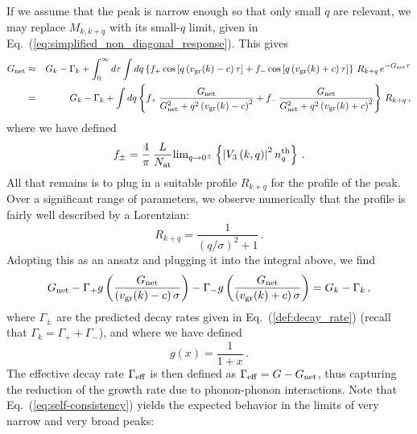 \documentclass[aps,prd,notitlepage,amsfonts,amssymb,amsmath,nofootinbib,superscriptaddress,longbibliography]{revtex4-2}
\begin{document}
\begin{appendices}
If we assume that the peak is narrow enough so that only small $q$ are relevant, we may replace $M_{k,k+q}$ with its small-$q$ limit, given in Eq.~(\ref{eq:simplified_non_diagonal_response}).  This gives
\begin{eqnarray}
    G_{\rm net} &\approx& G_{k}-\Gamma_{k} + \int_{0}^{\infty} d \tau \int dq \left\{ f_{+} \, {\rm cos}\left[q \left(v_{\rm gr}(k)-c\right) \tau \right] + f_{-} \, {\rm cos}\left[q \left(v_{\rm gr}(k)+c\right) \tau \right] \right\} \, R_{k+q} \, e^{-G_{\rm net} \tau} \nonumber \\
    &=& G_{k}-\Gamma_{k} + \int dq \left\{ f_{+} \, \frac{G_{\rm net}}{G_{\rm net}^{2} + q^{2}\left(v_{\rm gr}(k)-c\right)^{2}} + f_{-} \, \frac{G_{\rm net}}{G_{\rm net}^{2} + q^{2}\left(v_{\rm gr}(k)+c\right)^{2}} \right\} \, R_{k+q} \,,
\end{eqnarray}
where we have defined
\begin{equation}
    f_{\pm} = \frac{4}{\pi} \, \frac{L}{N_{\rm at}} {\rm lim}_{q \to 0^{\pm}} \left\{ \left|V_{3}\left(k,q\right)\right|^{2} n_{q}^{\rm th} \right\} \,.
\end{equation}
All that remains is to plug in a suitable profile $R_{k+q}$ for the profile of the peak.  Over a significant range of parameters, we observe numerically that the profile is fairly well described by a Lorentzian:
\begin{equation}
    R_{k+q} = \frac{1}{\left(q/\sigma\right)^{2}+1} \,.
\end{equation}
Adopting this as an ansatz and plugging it into the integral above, we find
\begin{equation}
    G_{\rm net} - \Gamma_{+} g\left(\frac{G_{\rm net}}{\left(v_{\rm gr}(k)-c\right) \sigma}\right) - \Gamma_{-} g\left(\frac{G_{\rm net}}{\left(v_{\rm gr}(k)+c\right) \sigma}\right) = G_{k}-\Gamma_{k} \,,
    \label{eq:self-consistency}
\end{equation}
where $\Gamma_{\pm}$ are the predicted decay rates given in Eq.~(\ref{def:decay_rate}) (recall that $\Gamma_{k} = \Gamma_{+}+\Gamma_{-}$), and where we have defined
\begin{equation}
    g(x) = \frac{1}{1+x} \,.
\end{equation}
The effective decay rate $\Gamma_{\rm eff}$ is then defined as $\Gamma_{\rm eff} = G - G_{\rm net}$, thus capturing the reduction of the growth rate due to phonon-phonon interactions. Note that Eq.~(\ref{eq:self-consistency}) yields the expected behavior in the limits of very narrow and very broad peaks:  
\begin{itemize}

\end{itemize}
\end{appendices}
\end{document}
